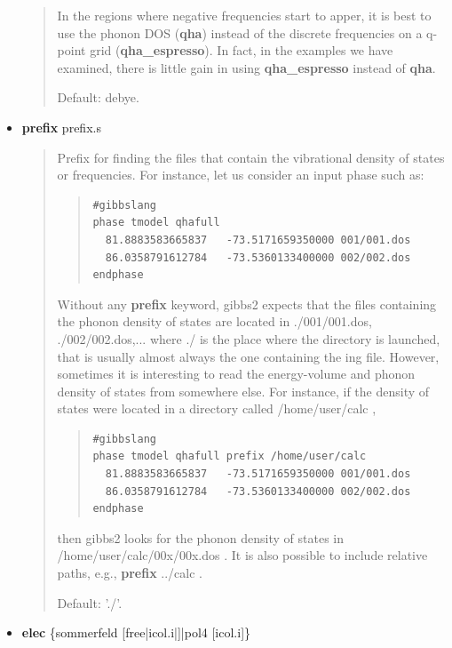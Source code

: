\documentclass[a4paper]{article}
\begin{document}
\begin{itemize}
\begin{quote}
In the regions where negative frequencies start to apper, it is
best to use the phonon DOS (\textbf{qha}) instead of the discrete
frequencies on a q-point grid (\textbf{qha\_espresso}). In fact, in the
examples we have examined, there is little gain in using
\textbf{qha\_espresso} instead of \textbf{qha}.

Default: debye.
\end{quote}

\item \textbf{prefix} prefix.s

\begin{quote}
Prefix for finding the files that contain the vibrational density
of states or frequencies. For instance, let us consider an input
phase such as:

\begin{quote}
\begin{verbatim}
#gibbslang
phase tmodel qhafull
  81.8883583665837   -73.5171659350000 001/001.dos
  86.0358791612784   -73.5360133400000 002/002.dos
endphase
\end{verbatim}
\end{quote}

Without any \textbf{prefix} keyword, gibbs2 expects that the files
containing the phonon density of states are located in
./001/001.dos, ./002/002.dos,... where ./ is the place where the
directory is launched, that is usually almost always the one
containing the ing file. However, sometimes it is interesting to
read the energy-volume and phonon density of states from somewhere
else. For instance, if the density of states were located in a
directory called /home/user/calc ,

\begin{quote}
\begin{verbatim}
#gibbslang
phase tmodel qhafull prefix /home/user/calc
  81.8883583665837   -73.5171659350000 001/001.dos
  86.0358791612784   -73.5360133400000 002/002.dos
endphase
\end{verbatim}
\end{quote}

then gibbs2 looks for the phonon density of states in
/home/user/calc/00x/00x.dos . It is also possible to include
relative paths, e.g., \textbf{prefix} ../calc .

Default: './'.
\end{quote}

\item \textbf{elec} \{sommerfeld {[}free|icol.i|{]}|pol4 {[}icol.i{]}\}


\end{itemize}
\end{document}
